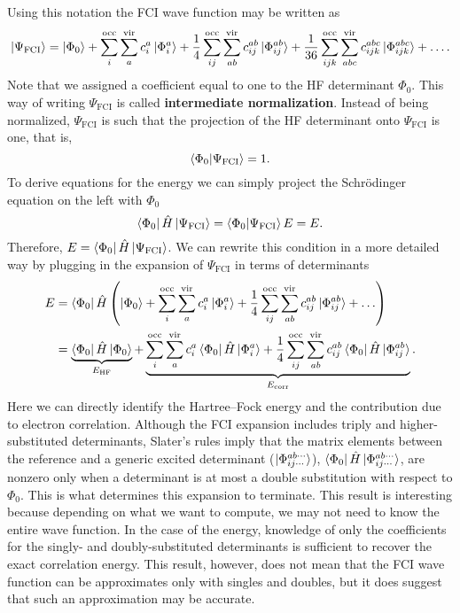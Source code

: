 \documentclass[../Main/chem532-notes.tex]{subfiles}
\begin{document}
Using this notation the FCI wave function may be written as
\begin{equation}
\ket{\Psi_{\mathrm{FCI}}} = 
\ket{\Phi_0}
+ \sum_{i}^{\mathrm{occ}} \sum_{a}^{\mathrm{vir}} c_i^a \ket{\Phi_{i}^{a}}
+ \frac{1}{4} \sum_{ij}^{\mathrm{occ}} \sum_{ab}^{\mathrm{vir}} c_{ij}^{ab} \ket{\Phi_{ij}^{ab}} + \frac{1}{36} \sum_{ijk}^{\mathrm{occ}} \sum_{abc}^{\mathrm{vir}} c_{ijk}^{abc} \ket{\Phi_{ijk}^{abc}} + \ldots.
\end{equation}
Note that we assigned a coefficient equal to one to the HF determinant $\Phi_0$. This way of writing $\Psi_{\mathrm{FCI}}$ is called \textbf{intermediate normalization}. Instead of being normalized, $\Psi_{\mathrm{FCI}}$ is such that the projection of the HF determinant onto $\Psi_{\mathrm{FCI}}$ is one, that is,
\begin{equation}
\braket{\Phi_0 | \Psi_{\mathrm{FCI}}} = 1.
\end{equation}
To derive equations for the energy we can simply project the Schr\"{o}dinger equation on the left with $\Phi_0$
\begin{equation}
\bra{\Phi_0}\hat{H}\ket{\Psi_{\mathrm{FCI}}} = \braket{\Phi_0|\Psi_{\mathrm{FCI}}} E = E.
\end{equation}
Therefore, $E = \bra{\Phi_0}\hat{H}\ket{\Psi_{\mathrm{FCI}}}$. We can rewrite this condition in a more detailed way by plugging in the expansion of $\Psi_{\mathrm{FCI}}$ in terms of determinants
\begin{equation}
\begin{split}
E & = \bra{\Phi_0}\hat{H}\left(
\ket{\Phi_0}
+ \sum_{i}^{\mathrm{occ}} \sum_{a}^{\mathrm{vir}} c_i^a \ket{\Phi_{i}^{a}}
+ \frac{1}{4} \sum_{ij}^{\mathrm{occ}} \sum_{ab}^{\mathrm{vir}} c_{ij}^{ab} \ket{\Phi_{ij}^{ab}} + \ldots\right) \\
& = \underbrace{\bra{\Phi_0}\hat{H}\ket{\Phi_0}}_{E_\mathrm{HF}}
+\underbrace{ \sum_{i}^{\mathrm{occ}} \sum_{a}^{\mathrm{vir}} c_i^a \bra{\Phi_0}\hat{H}\ket{\Phi_{i}^{a}}
+ \frac{1}{4} \sum_{ij}^{\mathrm{occ}} \sum_{ab}^{\mathrm{vir}} c_{ij}^{ab} \bra{\Phi_0}\hat{H}\ket{\Phi_{ij}^{ab}}}_{E_\mathrm{corr}}.
\end{split}
\end{equation}
Here we can directly identify the Hartree--Fock energy and the contribution due to electron correlation.
Although the FCI expansion includes triply and higher-substituted determinants, Slater's rules imply that the matrix elements between the reference and a generic excited determinant ($\ket{\Phi_{ij\cdots}^{ab\cdots}}$), $\bra{\Phi_0}\hat{H}\ket{\Phi_{ij\cdots}^{ab\cdots}}$, are nonzero only when a determinant is at most a double substitution with respect to $\Phi_0$.
This is what determines this expansion to terminate.
This result is interesting because depending on what we want to compute, we may not need to know the entire wave function. In the case of the energy, knowledge of only the coefficients for the singly- and doubly-substituted determinants is sufficient to recover the exact correlation energy.
This result, however, does not mean that the FCI wave function can be approximates only with singles and doubles, but it does suggest that such an approximation may be accurate.
\end{document}
